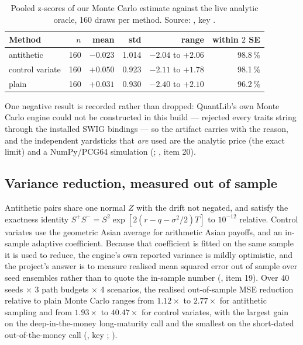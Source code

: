 \documentclass[11pt,a4paper]{article}
\begin{document}
\begin{table}[t]
\caption[Pooled z-scores of our Monte Carlo estimate against the live analytic oracle, 16]{Pooled z-scores of our Monte Carlo estimate against the live analytic oracle,
160 draws per method. Source:
, key
.}
\label{tab:zscores}
\centering\small
\begin{tabular}{lrrrrr}
\toprule
Method & $n$ & mean & std & range & within $2$ SE \\
\midrule
antithetic & 160 & $-0.023$ & 1.014 & $-2.04$ to $+2.06$ & 98.8\,\% \\
control variate & 160 & $+0.050$ & 0.923 & $-2.11$ to $+1.78$ & 98.1\,\% \\
plain & 160 & $+0.031$ & 0.930 & $-2.40$ to $+2.10$ & 96.2\,\% \\
\bottomrule
\end{tabular}
\end{table}

One negative result is recorded rather than dropped: QuantLib's own Monte Carlo engine could
not be constructed in this build ---  rejected every traits string
through the installed SWIG bindings --- so the artifact carries
 with the reason, and the independent yardsticks that
\emph{are} used are the analytic price (the exact limit) and a NumPy/PCG64 simulation
(;
, item 20).

\subsection{Variance reduction, measured out of sample}
Antithetic pairs share one normal $Z$ with the drift not negated, and satisfy the exactness
identity $S^{+} S^{-} = S^2 \exp[2(r - q - \sigma^2/2)T]$ to $10^{-12}$ relative. Control
variates use the geometric Asian average for arithmetic Asian payoffs, and an in-sample
adaptive coefficient. Because that coefficient is fitted on the same sample it is used to
reduce, the engine's own reported variance is mildly optimistic, and the project's answer is
to measure realised mean squared error out of sample over seed ensembles rather than to quote
the in-sample number (, item 19). Over 40 seeds $\times$ 3 path
budgets $\times$ 4 scenarios, the realised out-of-sample MSE reduction relative to plain
Monte Carlo ranges from $1.12\times$ to $2.77\times$ for antithetic sampling and from
$1.93\times$ to $40.47\times$ for control variates, with the largest gain on the
deep-in-the-money long-maturity call and the smallest on the short-dated out-of-the-money call
(, key
; ).
\end{document}
